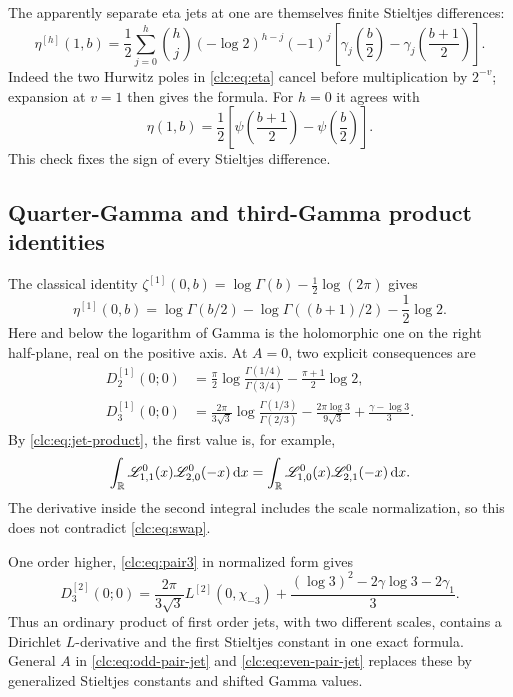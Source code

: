 \documentclass[11pt,a4paper]{article}
\numberwithin{equation}{section}
\theoremstyle{definition}\newtheorem{definition}[theorem]{Definition}
\theoremstyle{remark}\newtheorem{remark}[theorem]{Remark}
\newcommand{\dd}{\,\mathrm d}
\begin{document}
The apparently separate eta jets at one are themselves finite
Stieltjes differences:
\begin{equation}\label{clc:eq:eta-Stieltjes}
 \eta^{[h]}(1,b)=\frac12\sum_{j=0}^h\binom hj(-\log2)^{h-j}(-1)^j
 \left[\gamma_j\left(\frac b2\right)
       -\gamma_j\left(\frac{b+1}2\right)\right].
\end{equation}
Indeed the two Hurwitz poles in \eqref{clc:eq:eta} cancel before
multiplication by $2^{-v}$; expansion at $v=1$ then gives the formula.
For $h=0$ it agrees with
\begin{equation}\label{clc:eq:eta-one}
 \eta(1,b)=\frac12\left[\psi\left(\frac{b+1}2\right)
                              -\psi\left(\frac b2\right)\right].
\end{equation}
This check fixes the sign of every Stieltjes difference.

\subsection{Quarter-Gamma and third-Gamma product identities}
The classical identity
$\zeta^{[1]}(0,b)=\log\Gamma(b)-\tfrac12\log(2\pi)$
\cite{DLMF25} gives
\begin{equation}\label{clc:eq:eta-zerojet}
 \eta^{[1]}(0,b)=\log\Gamma(b/2)-\log\Gamma((b+1)/2)
                              -\frac12\log2.
\end{equation}
Here and below the logarithm of Gamma is the holomorphic one on the
right half-plane, real on the positive axis.
At $A=0$, two explicit consequences are
\begin{align}
 D_2^{[1]}(0;0)
 &=\frac\pi2\log\frac{\Gamma(1/4)}{\Gamma(3/4)}
                  -\frac{\pi+1}{2}\log2,\label{clc:eq:quarter}\\
 D_3^{[1]}(0;0)
 &=\frac{2\pi}{3\sqrt3}\log\frac{\Gamma(1/3)}{\Gamma(2/3)}
   -\frac{2\pi\log3}{9\sqrt3}+\frac{\gamma-\log3}{3}.
 \label{clc:eq:third}
\end{align}
By \eqref{clc:eq:jet-product}, the first value is, for example,
\[
 \int_\R\mathscr L_{1,1}^{0}(x)\mathscr L_{2,0}^{0}(-x)\dd x
 =\int_\R\mathscr L_{1,0}^{0}(x)\mathscr L_{2,1}^{0}(-x)\dd x.
\]
The derivative inside the second integral includes the scale
normalization, so this does not contradict \eqref{clc:eq:swap}.

One order higher, \eqref{clc:eq:pair3} in normalized form gives
\begin{equation}\label{clc:eq:third2}
 D_3^{[2]}(0;0)=\frac{2\pi}{3\sqrt3}L^{[2]}(0,\chi_{-3})
       +\frac{(\log3)^2-2\gamma\log3-2\gamma_1}{3}.
\end{equation}
Thus an ordinary product of first order jets, with two different scales,
contains a Dirichlet $L$-derivative and the first Stieltjes constant in
one exact formula. General $A$ in \eqref{clc:eq:odd-pair-jet} and
\eqref{clc:eq:even-pair-jet} replaces these by generalized Stieltjes
constants and shifted Gamma values.
\end{document}
